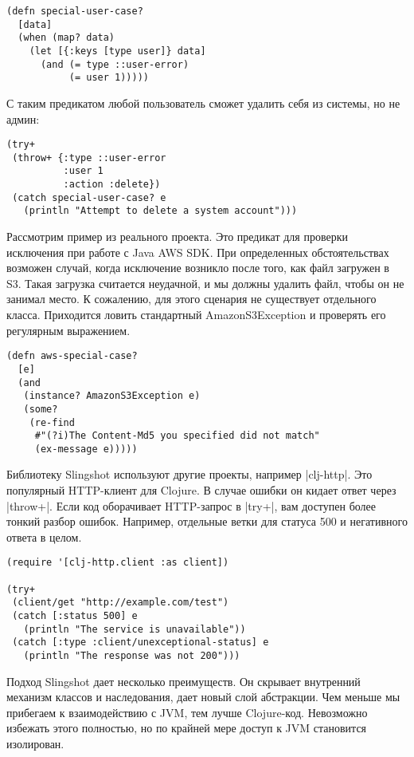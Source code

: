 \begin{verbatim}
(defn special-user-case?
  [data]
  (when (map? data)
    (let [{:keys [type user]} data]
      (and (= type ::user-error)
           (= user 1)))))
\end{verbatim}

С таким предикатом любой пользователь сможет удалить себя из системы, но не
админ:

\begin{verbatim}
(try+
 (throw+ {:type ::user-error
          :user 1
          :action :delete})
 (catch special-user-case? e
   (println "Attempt to delete a system account")))
\end{verbatim}

Рассмотрим пример из реального проекта. Это предикат для проверки исключения при
работе с Java AWS SDK. При определенных обстоятельствах возможен случай, когда
исключение возникло после того, как файл загружен в S3. Такая загрузка считается
неудачной, и мы должны удалить файл, чтобы он не занимал место. К сожалению, для
этого сценария не существует отдельного класса. Приходится ловить стандартный
AmazonS3Exception и проверять его регулярным выражением.

\begin{verbatim}
(defn aws-special-case?
  [e]
  (and
   (instance? AmazonS3Exception e)
   (some?
    (re-find
     #"(?i)The Content-Md5 you specified did not match"
     (ex-message e)))))
\end{verbatim}

Библиотеку Slingshot используют другие проекты, например \spverb|clj-http|. Это
популярный HTTP-клиент для Clojure. В случае ошибки он кидает ответ через
\spverb|throw+|. Если код оборачивает HTTP-запрос в \spverb|try+|, вам доступен более тонкий
разбор ошибок. Например, отдельные ветки для статуса 500 и негативного ответа в
целом.

\begin{verbatim}
(require '[clj-http.client :as client])

(try+
 (client/get "http://example.com/test")
 (catch [:status 500] e
   (println "The service is unavailable"))
 (catch [:type :client/unexceptional-status] e
   (println "The response was not 200")))
\end{verbatim}

Подход Slingshot дает несколько преимуществ. Он скрывает внутренний механизм
классов и наследования, дает новый слой абстракции. Чем меньше мы прибегаем к
взаимодействию с JVM, тем лучше Clojure-код. Невозможно избежать этого
полностью, но по крайней мере доступ к JVM становится изолирован.

